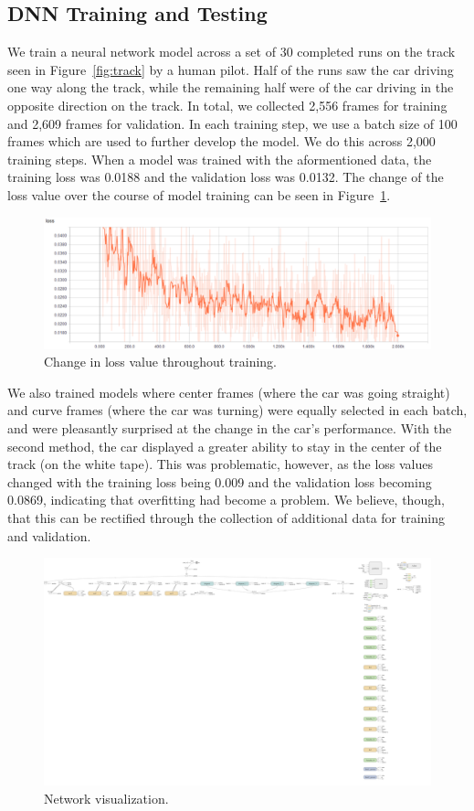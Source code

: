 \subsection{DNN Training and Testing}
We train a neural network model across a set of 30 completed runs on 
the track seen in Figure~\ref{fig:track} by a human pilot. Half of 
the runs saw the car driving one way along the track, while the 
remaining half were of the car driving in the opposite direction on 
the track. In total, we collected 2,556 frames for training and 2,609 
frames for validation. In each training step, we use a batch size of 
100 frames which are used to further develop the model. We do this 
across 2,000 training steps. When a model was trained with the 
aformentioned data, the training loss was 0.0188 and the validation 
loss was 0.0132. The change of the loss value over the course of model training can be seen in Figure~\ref{fig:modelloss}.

\begin{figure}[h]
  \centering
  \includegraphics[width=.5\textwidth]{figs/TrainingLoss}
  \caption{Change in loss value throughout training.}
  \label{fig:modelloss}
\end{figure}

We also trained models where center frames (where the car was going 
straight) and curve frames (where the car was turning) were equally 
selected in each batch, and were pleasantly surprised at the change 
in the car's performance. With the second method, the car displayed a 
greater ability to stay in the center of the track (on the white 
tape). This was problematic, however, as the loss values changed with 
the training loss being 0.009 and the validation loss becoming 
0.0869, indicating that overfitting had become a problem. We believe, 
though, that this can be rectified through the collection of 
additional data for training and validation.

\begin{figure}[h]
  \centering
  \includegraphics[width=.55\textwidth]{figs/graph_run=.pdf}
  \caption{ Network visualization. }
  \label{fig:}
\end{figure}

